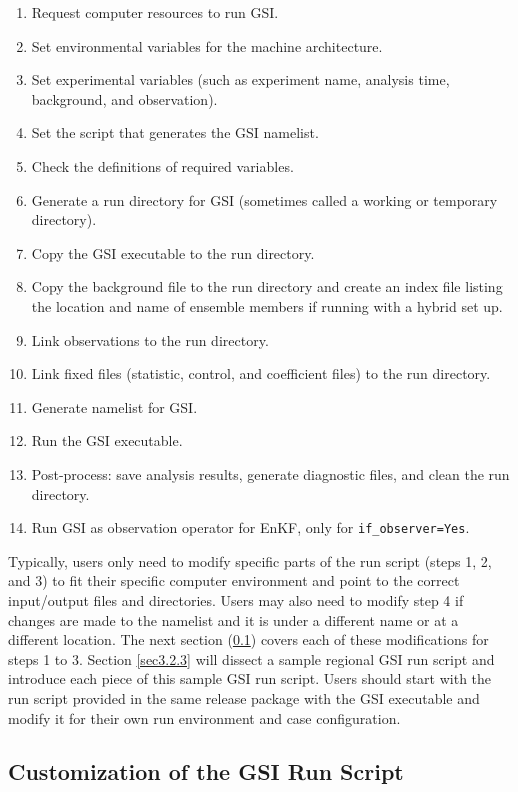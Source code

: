 \begin{enumerate}
\item Request computer resources to run GSI.
\item Set environmental variables for the machine architecture.
\item Set experimental variables (such as experiment name, analysis time, background, and observation).
\item Set the script that generates the GSI namelist.
\item Check the definitions of required variables. 
\item Generate a run directory for GSI (sometimes called a working or temporary directory).
\item Copy the GSI executable to the run directory.
\item Copy the background file to the run directory and create an index file listing the location and name of ensemble members if running with a hybrid set up.
\item Link observations to the run directory.
\item Link fixed files (statistic, control, and coefficient files) to the run directory. 
\item Generate namelist for GSI.
\item Run the GSI executable.
\item Post-process: save analysis results, generate diagnostic files, and clean the run directory.
\item Run GSI as observation operator for EnKF, only for \verb|if_observer=Yes|.
\end{enumerate}

Typically, users only need to modify specific parts of the run script (steps 1, 2, and 3) to fit their specific computer environment and point to the correct input/output files and directories. Users may also need to modify step 4 if changes are made to the namelist and it is under a different name or at a different location. The next section (\ref{sec3.2.2}) covers each of these modifications for steps 1 to 3. Section \ref{sec3.2.3} will dissect a sample regional GSI run script and introduce each piece of this sample GSI run script. Users should start with the run script provided in the same release package with the GSI executable and modify it for their own run environment and case configuration.


\subsection{Customization of the GSI Run Script}
\label{sec3.2.2}

